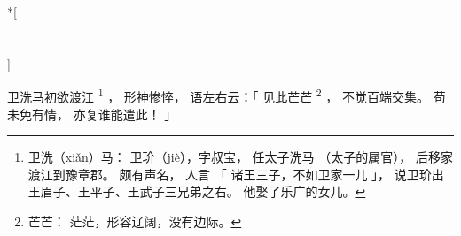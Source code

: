 
\switchcolumn[0]*[\section{}]

卫洗马初欲渡江%
\footnote{%
    卫洗（xiǎn）马：
        卫玠（jiè），字叔宝，
        任太子洗马
        （太子的属官），
        后移家渡江到豫章郡。
        颇有声名，
        人言
        「
            诸王三子，不如卫家一儿
        」，
        说卫玠出王眉子、王平子、王武子三兄弟之右。
        他娶了乐广的女儿。
}%
，
形神惨悴，
语左右云：「
    见此芒芒%
    \footnote{%
        芒芒：
            茫茫，形容辽阔，没有边际。
    }%
    ，
    不觉百端交集。
    苟未免有情，
    亦复谁能遣此！
」

\switchcolumn



